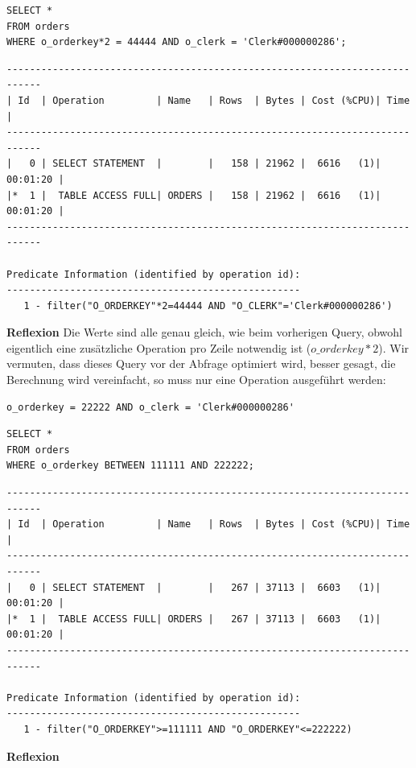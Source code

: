 \documentclass[10pt]{article}
\begin{document}
\begin{lstlisting}[style=sql]
SELECT *
FROM orders
WHERE o_orderkey*2 = 44444 AND o_clerk = 'Clerk#000000286';
\end{lstlisting}
\begin{lstlisting}[style=queryexecutionplan]
----------------------------------------------------------------------------
| Id  | Operation         | Name   | Rows  | Bytes | Cost (%CPU)| Time     |
----------------------------------------------------------------------------
|   0 | SELECT STATEMENT  |        |   158 | 21962 |  6616   (1)| 00:01:20 |
|*  1 |  TABLE ACCESS FULL| ORDERS |   158 | 21962 |  6616   (1)| 00:01:20 |
----------------------------------------------------------------------------

Predicate Information (identified by operation id):
---------------------------------------------------
   1 - filter("O_ORDERKEY"*2=44444 AND "O_CLERK"='Clerk#000000286')
\end{lstlisting}
\textbf{Reflexion} \newline
Die Werte sind alle genau gleich, wie beim vorherigen Query, obwohl eigentlich 
eine zusätzliche Operation pro Zeile notwendig ist ($o\_orderkey*2$). Wir 
vermuten, dass dieses Query vor der Abfrage optimiert wird, besser gesagt, die
Berechnung wird vereinfacht, so muss nur eine Operation ausgeführt werden:
\begin{lstlisting}[style=sqlNoTitle]
o_orderkey = 22222 AND o_clerk = 'Clerk#000000286'
\end{lstlisting}

\begin{lstlisting}[style=sql]
SELECT *
FROM orders
WHERE o_orderkey BETWEEN 111111 AND 222222;
\end{lstlisting}
\begin{lstlisting}[style=queryexecutionplan]
----------------------------------------------------------------------------
| Id  | Operation         | Name   | Rows  | Bytes | Cost (%CPU)| Time     |
----------------------------------------------------------------------------
|   0 | SELECT STATEMENT  |        |   267 | 37113 |  6603   (1)| 00:01:20 |
|*  1 |  TABLE ACCESS FULL| ORDERS |   267 | 37113 |  6603   (1)| 00:01:20 |
----------------------------------------------------------------------------

Predicate Information (identified by operation id):
---------------------------------------------------
   1 - filter("O_ORDERKEY">=111111 AND "O_ORDERKEY"<=222222)
\end{lstlisting}
\textbf{Reflexion} \newline
\end{document}
